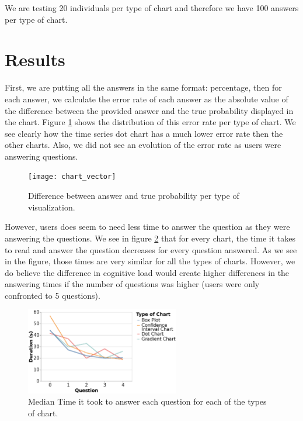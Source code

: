 \documentclass[a4paper,3p,sort&compress]{elsarticle}
\begin{document}
We are testing 20 individuals per type of chart and therefore we have 100 answers per 
type of chart.

\section{Results}
\label{sec:results}

First, we are putting all the answers in the same format: percentage, then for each answer, we calculate the 
error rate of each answer as the absolute value of the difference 
between the provided answer and the true probability displayed in the chart. Figure \ref{figure:errors} shows 
the distribution of this error rate per type of chart. We see clearly how the time series dot chart
has a much lower error rate then the other charts. Also, we did not see an evolution of the error rate as 
users were answering questions.

\begin{figure}
  \centering
  \texttt{[image: chart\_vector]}
  \caption{\label{figure:errors}Difference between answer and true probability per type of visualization.}
\end{figure}

However, users does seem to need less time to answer the question as they were answering the questions. 
We see in figure \ref{figure:duration} that for every chart, the time it takes 
to read and answer the question decreases for every question answered. As we see in the figure, those times 
are very similar for all the types of charts. However, we do believe the difference in cognitive load would 
create higher differences in the answering times if the number of questions was higher (users were only confronted
to 5 questions).

\begin{figure}
  \centering
   \includegraphics[width=0.6\textwidth]{duration_evo2}
  \caption{\label{figure:duration} Median Time it took to answer each question for each of the types of chart.}
\end{figure}  
\end{document}
